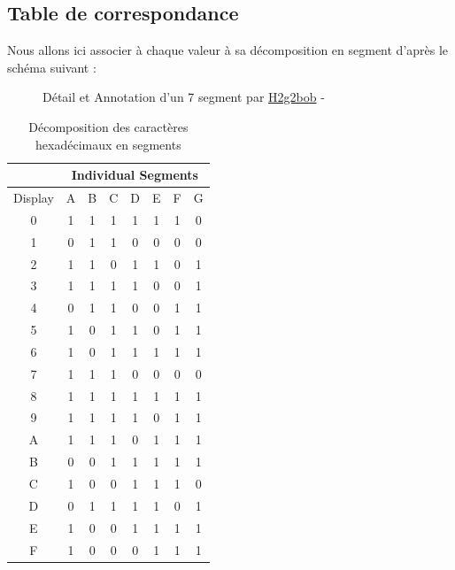 \subsection{Table de correspondance}
Nous allons ici associer à chaque valeur à sa décomposition en segment d'après le schéma suivant :
\begin{figure}[H]
	\caption{Détail et Annotation d'un 7 segment par \href{https://commons.wikimedia.org/wiki/User:H2g2bob}{H2g2bob} - \ccLogo\ccAttribution\ccShareAlike}
\end{figure}

\begin{table}[h]
\centering
\begin{tabular}{|c|c|c|c|c|c|c|c|}
	\hline
		& \multicolumn{7}{c|}{Individual Segments} \\
	\hline
	Display & A & B & C & D & E & F & G \\
	\hline
	0       & 1 & 1 & 1 & 1 & 1 & 1 & 0 \\
	\hline
	1       & 0 & 1 & 1 & 0 & 0 & 0 & 0 \\
	\hline
	2       & 1 & 1 & 0 & 1 & 1 & 0 & 1 \\
	\hline
	3       & 1 & 1 & 1 & 1 & 0 & 0 & 1 \\
	\hline
	4       & 0 & 1 & 1 & 0 & 0 & 1 & 1 \\
	\hline
	5       & 1 & 0 & 1 & 1 & 0 & 1 & 1 \\
	\hline
	6       & 1 & 0 & 1 & 1 & 1 & 1 & 1 \\
	\hline
	7       & 1 & 1 & 1 & 0 & 0 & 0 & 0 \\
	\hline
	8       & 1 & 1 & 1 & 1 & 1 & 1 & 1 \\
	\hline
	9       & 1 & 1 & 1 & 1 & 0 & 1 & 1 \\
	\hline
	A       & 1 & 1 & 1 & 0 & 1 & 1 & 1 \\
	\hline
	B       & 0 & 0 & 1 & 1 & 1 & 1 & 1 \\
	\hline
	C       & 1 & 0 & 0 & 1 & 1 & 1 & 0 \\
	\hline
	D       & 0 & 1 & 1 & 1 & 1 & 0 & 1 \\
	\hline
	E       & 1 & 0 & 0 & 1 & 1 & 1 & 1 \\
	\hline
	F       & 1 & 0 & 0 & 0 & 1 & 1 & 1 \\
	\hline
\end{tabular}
	\caption{Décomposition des caractères hexadécimaux en segments}
\end{table}

